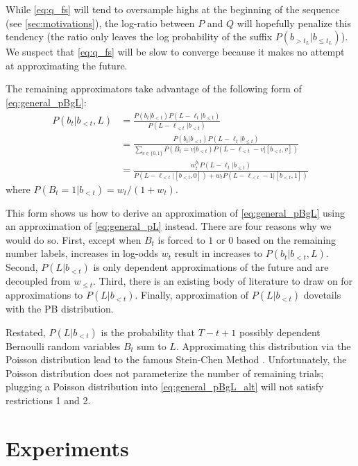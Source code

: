 \documentclass{article}
\begin{document}
While \cref{eq:q_fs} will tend to oversample highs at the beginning of the
sequence (see \cref{sec:motivations}), the log-ratio between $P$ and $Q$ will
hopefully penalize this tendency (the ratio only leaves the log probability of
the suffix $P(b_{> t_L}|b_{\leq t_L})$). We suspect that \cref{eq:q_fs} will
be slow to converge because it makes no attempt at approximating the future.

The remaining approximators take advantage of the following form of
\cref{eq:general_pBgL}:
%
\begin{equation} \label{eq:general_pBgL_alt}
\begin{split}
    P(b_t|b_{<t}, L)
    &=  \frac{P(b_t|b_{<t})P(L - \ell_t|b_{\leq t})}
        {P(L - \ell_{<t}|b_{<t})} \\
    &= \frac{P(b_t|b_{<t})P(L - \ell_t|b_{\leq t})}
       {\sum_{v \in \{0,1\}} P(B_t=v|b_{<t})P(L - \ell_{<t} - v|[b_{<t}, v])} \\
    &= \frac{w_t^{b_t}P(L - \ell_t|b_{\leq t})}
        {P(L - \ell_{<t}|[b_{<t}, 0]) + w_t P(L - \ell_{<t} - 1|[b_{<t}, 1])}
\end{split}
\end{equation}
%
where $P(B_t=1|b_{<t}) = w_t / (1 + w_t)$.

This form shows us how to derive an approximation of \cref{eq:general_pBgL}
using an approximation of \cref{eq:general_pL} instead. There are four
reasons why we would do so. First, except when $B_t$ is forced to $1$ or
$0$ based on the remaining number labels, increases in log-odds $w_t$ result
in increases to $P(b_t|b_{<t}, L)$. Second, $P(L|b_{<t})$ is only dependent
approximations of the future and are decoupled from $w_{\leq t}$. Third,
there is an existing body of literature to draw on for approximations to
$P(L|b_{<t})$. Finally, approximation of $P(L|b_{<t})$ dovetails with the PB
distribution.

Restated, $P(L|b_{<t})$ is the probability that $T - t + 1$ possibly dependent
Bernoulli random variables $B_t$ sum to $L$. Approximating this distribution
via the Poisson distribution lead to the famous Stein-Chen Method
\cite{chenWeightedFinitePopulation1994}. Unfortunately, the
Poisson distribution does not parameterize the number of remaining trials;
plugging a Poisson distribution into \cref{eq:general_pBgL_alt} will not
satisfy restrictions 1 and 2.

\section{Experiments} \label{sec:experiments}
\end{document}
